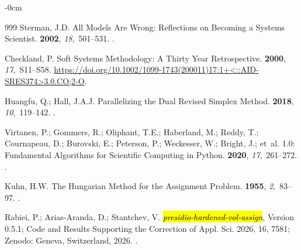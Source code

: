 \documentclass[systems,article,accept,moreauthors,pdftex]{Definitions/mdpi}
\begin{document}
\begin{adjustwidth}{-\extralength}{0cm}
\begin{thebibliography}{999}
Sterman, J.D.
\newblock All Models Are Wrong: Reflections on Becoming a Systems Scientist.
 {\bf 2002}, {\em 18},~501--531.
.

Checkland, P.
\newblock Soft Systems Methodology: A Thirty Year Retrospective.
 {\bf 2000}, {\em
  17},~S11--S58.
\newblock
  {\url{https://doi.org/10.1002/1099-1743(200011)17:1+<::AID-SRES374>3.0.CO;2-O}}.

Huangfu, Q.; Hall, J.A.J.
\newblock Parallelizing the Dual Revised Simplex Method.
 {\bf 2018}, {\em
  10},~119--142.
.

Virtanen, P.; Gommers, R.; Oliphant, T.E.; Haberland, M.; Reddy, T.;
  Cournapeau, D.; Burovski, E.; Peterson, P.; Weckesser, W.; Bright, J.;
  et~al.
 1.0: Fundamental Algorithms for Scientific Computing in
  {Python}.
 {\bf 2020}, {\em 17},~261--272.
.

Kuhn, H.W.
\newblock The {Hungarian} Method for the Assignment Problem.
 {\bf 1955}, {\em 2},~83--97.
.

Rabiei, P.; Arias-Aranda, D.; Stantchev, V.
\newblock \emph{\hl{presidio-hardened-vol-assign}}, Version 0.5.1; Code and Results
  Supporting the Correction of {Appl. Sci.} 2026, 16, 7581; %
\newblock Zenodo: Geneva, Switzerland,  2026.
.

\end{thebibliography}

\PublishersNote{}
\end{adjustwidth}
\end{document}
